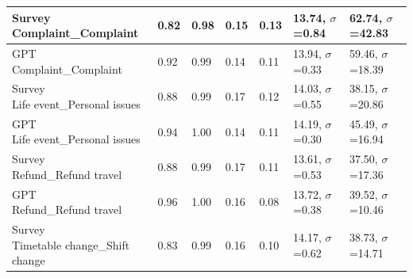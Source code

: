 \begin{table}[h]
{\begin{tabular}{|l|l|l|l|l|l|l|}
    \shortstack[l]{Survey\\Complaint\_Complaint}                                      & 0.82                          & 0.98                         & 0.15                              & 0.13                              & 13.74, $\sigma$=0.84               & 62.74, $\sigma$=42.83          \\ \hline
    \shortstack[l]{GPT\\Complaint\_Complaint}                                         & 0.92                          & 0.99                         & 0.14                              & 0.11                              & 13.94, $\sigma$=0.33               & 59.46, $\sigma$=18.39          \\ \hline
    \shortstack[l]{Survey\\Life event\_Personal issues}                               & 0.88                          & 0.99                         & 0.17                              & 0.12                              & 14.03, $\sigma$=0.55               & 38.15, $\sigma$=20.86          \\ \hline
    \shortstack[l]{GPT\\Life event\_Personal issues}                                  & 0.94                          & 1.00                         & 0.14                              & 0.11                              & 14.19, $\sigma$=0.30               & 45.49, $\sigma$=16.94          \\ \hline
    \shortstack[l]{Survey\\Refund\_Refund travel}                                     & 0.88                          & 0.99                         & 0.17                              & 0.11                              & 13.61, $\sigma$=0.53               & 37.50, $\sigma$=17.36          \\ \hline
    \shortstack[l]{GPT\\Refund\_Refund travel}                                        & 0.96                          & 1.00                         & 0.16                              & 0.08                              & 13.72, $\sigma$=0.38               & 39.52, $\sigma$=10.46          \\ \hline
    \shortstack[l]{Survey\\Timetable change\_Shift change}                            & 0.83                          & 0.99                         & 0.16                              & 0.10                              & 14.17, $\sigma$=0.62               & 38.73, $\sigma$=14.71          \\ \hline

\end{tabular}}
\end{table}

